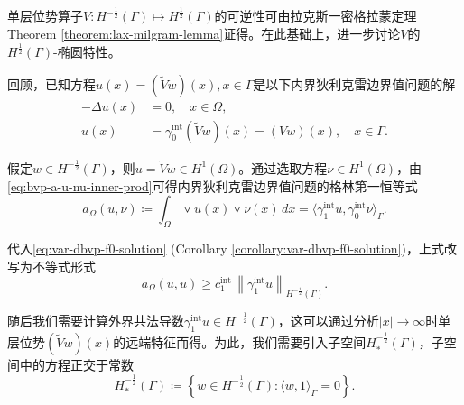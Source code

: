 单层位势算子$V:H^{-\frac{1}{2}}(\Gamma) \mapsto H^{\frac{1}{2}}(\Gamma)$的可逆性可由拉克斯一密格拉蒙定理Theorem \ref{theorem:lax-milgram-lemma}证得。在此基础上，进一步讨论$V$的$H^{\frac{1}{2}}(\Gamma)$-椭圆特性。

回顾，已知方程$u(x) = \left( \widetilde{V} w \right)(x), x \in \Gamma$是以下内界狄利克雷边界值问题的解
\begin{equation*}
  \begin{split}
    - \Delta u (x) &= 0, \quad x \in \Omega, \\
    u(x) &= \gamma_{0}^{\text{int}} \left( \widetilde{V} w \right)(x) = \left( V w \right)(x), \quad x \in \Gamma.
  \end{split}
\end{equation*}

假定$w \in H^{-\frac{1}{2}}(\Gamma)$，则$u = \widetilde{V} w \in H^{1}(\Omega)$。通过选取方程$\nu \in H^{1}(\Omega)$，由\eqref{eq:bvp-a-u-nu-inner-prod}可得内界狄利克雷边界值问题的格林第一恒等式
\begin{equation}
  \label{eq:bvp-bie-interior-dirichlet-green}
  a_{\Omega} (u, \nu) \coloneqq \int_{\Omega} \triangledown u(x) \triangledown \nu(x) \, d x
  = \langle \gamma_{1}^{\text{int}} u, \gamma_{0}^{\text{int}} \nu \rangle_{\Gamma}.
\end{equation}

代入\eqref{eq:var-dbvp-f0-solution} (Corollary \ref{corollary:var-dbvp-f0-solution})，上式改写为不等式形式
\begin{equation}
  \label{eq:bvp-bie-interior-dirichlet-green-ineq}
  a_{\Omega}(u,u) \ge c_{1}^{\text{int}} \,
  \left\| \gamma_{1}^{\text{int}} u \right\|_{H^{-\frac{1}{2}}(\Gamma)}.
\end{equation}

随后我们需要计算外界共法导数$\gamma_{1}^{\text{int}} u \in H^{-\frac{1}{2}}(\Gamma)$，这可以通过分析$\left| x \right| \rightarrow \infty$时单层位势$\left( \widetilde{V} w \right)(x)$的远端特征而得。为此，我们需要引入子空间$H_{*}^{-\frac{1}{2}}(\Gamma)$，子空间中的方程正交于常数
\begin{equation*}
  H_{*}^{-\frac{1}{2}}(\Gamma) \coloneqq
  \left\{
  w \in H^{-\frac{1}{2}}(\Gamma) : \langle w, 1 \rangle_{\Gamma} = 0
  \right\}.
\end{equation*}

